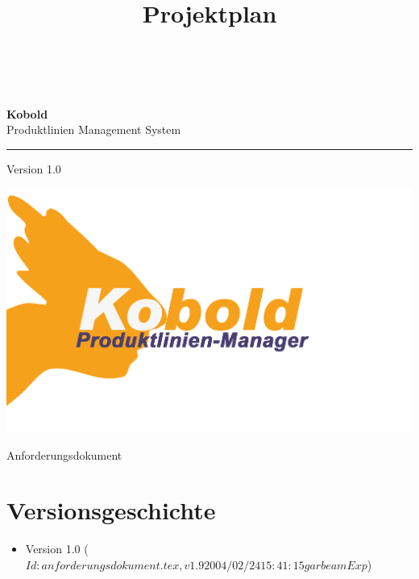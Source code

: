 \documentclass[a4paper,titlepage,12pt,ngerman]{scrbook}
\title {\huge \product\\[0.5cm]\large Projektplan \\[0.5cm] \version
  \\[1cm] \Large \company}
\newcommand\version{Version 1.0\xspace}
\begin{document}

\begin{titlepage}
\renewcommand{\thefootnote}{\fnsymbol{footnote}}
{\Huge
\raggedright
\textbf{\bf Kobold} \\
\huge Produktlinien Management System
\rule{\textwidth}{0.75pt}
\par
}
\begin{flushleft}
\normalsize
\version
\end{flushleft}

\vspace*{3cm}
\begin{center}
\includegraphics[width=15cm]{../common/logo-color.png}
\end{center}
\vfill

{\parindent=0cm
\Huge Anforderungsdokument
}


\setcounter{footnote}{0}
\end{titlepage}


\section*{Versionsgeschichte}

\begin{itemize}

\item Version 1.0  ($Id: anforderungsdokument.tex,v 1.9 2004/02/24 15:41:15 garbeam Exp $)


\end{itemize}


\tableofcontents




\appendix

\end{document}
